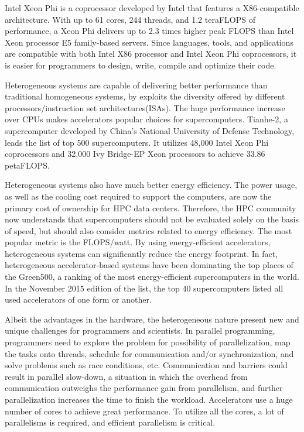 Intel Xeon Phi is a coprocessor developed by Intel that features a 
X86-compatible architecture. With up to 61 cores, 244 threads, 
and 1.2 teraFLOPS of performance, a Xeon Phi delivers up to 2.3 times higher 
peak FLOPS than Intel Xeon processor E5 family-based servers.
Since languages, tools, and applications are compatible with both Intel X86 
processor and Intel Xeon Phi coprocessors, it is easier for programmers to
design, write, compile and optimize their code. 




Heterogeneous systems are capable of delivering better performance than 
traditional homogeneous systems, by exploits the diversity offered by different 
processors/instruction set architectures(ISAs). 
The huge performance increase over CPUs makes accelerators popular choices for
supercomputers. Tianhe-2, a supercomputer developed by China’s National 
University of Defense Technology, leads the list of top 500 supercomputers.
It utilizes 48,000  Intel Xeon Phi coprocessors and 32,000 Ivy Bridge-EP Xeon 
processors to achieve 33.86 petaFLOPS.

Heterogeneous systems also have much better energy efficiency. 
The power usage, as well as the cooling cost required to support the computers,
are now the primary cost of ownership for HPC data centers. Therefore,
the HPC community now understands that supercomputers should not be evaluated
solely on the basis of speed, but should also consider metrics related to 
energy efficiency. The most popular metric is the FLOPS/watt.
By using energy-efficient accelerators,
heterogeneous systems can significantly reduce the energy footprint. 
In fact, heterogeneous accelerator-based systems have been dominating the 
top places of the Green500, %
a ranking of the most energy-efficient supercomputers in the world. 
In the November 2015 edition of the list, 
the top 40 supercomputers listed all used accelerators of one form or another.

Albeit the advantages in the hardware, the heterogeneous nature present new
and unique challenges for programmers and scientists. 
In parallel programming, programmers need to explore the problem for 
possibility of parallelization, map the tasks onto threads, schedule for
communication and/or synchronization, and solve problems such as race conditions,
etc. Communication and barriers could result in parallel slow-down, 
a situation in which the overhead from communication outweighs the performance 
gain from parallelism, and further parallelization increases the time to finish
the workload. 
Accelerators use a huge number of cores to achieve great performance. 
To utilize all the cores, a lot of parallelisms is required, and efficient 
parallelism is critical. 

